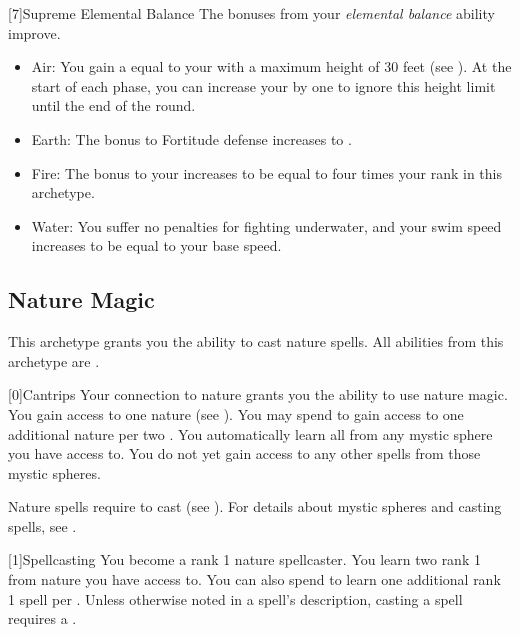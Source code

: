         [7]{Supreme Elemental Balance} The bonuses from your \textit{elemental balance} ability improve.
        \begin{itemize}
            \item Air: You gain a  equal to your  with a maximum height of 30 feet (see ).
            At the start of each phase, you can increase your  by one to ignore this height limit until the end of the round.
            \item Earth: The bonus to Fortitude defense increases to .
            \item Fire: The bonus to your  increases to be equal to four times your rank in this archetype.
            \item Water: You suffer no penalties for fighting underwater, and your swim speed increases to be equal to your base speed.
        \end{itemize}

    \newpage
    \subsection{Nature Magic}
        This archetype grants you the ability to cast nature spells.
        All abilities from this archetype are .

        [0]{Cantrips}
        Your connection to nature grants you the ability to use nature magic.
        You gain access to one nature  (see ).
        You may spend  to gain access to one additional nature  per two .
        You automatically learn all  from any mystic sphere you have access to.
        You do not yet gain access to any other spells from those mystic spheres.

        Nature spells require  to cast (see ).
        For details about mystic spheres and casting spells, see .

        [1]{Spellcasting}
        You become a rank 1 nature spellcaster.
        You learn two rank 1  from nature  you have access to.
        You can also spend  to learn one additional rank 1 spell per .
        Unless otherwise noted in a spell's description, casting a spell requires a .

